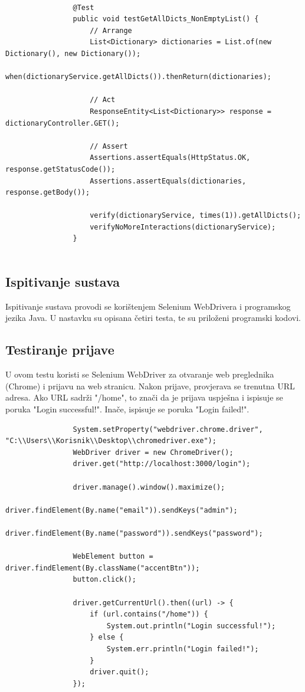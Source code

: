 			\begin{lstlisting}
				
				@Test
				public void testGetAllDicts_NonEmptyList() {
					// Arrange
					List<Dictionary> dictionaries = List.of(new Dictionary(), new Dictionary());
					when(dictionaryService.getAllDicts()).thenReturn(dictionaries);
					
					// Act
					ResponseEntity<List<Dictionary>> response = dictionaryController.GET();
					
					// Assert
					Assertions.assertEquals(HttpStatus.OK, response.getStatusCode());
					Assertions.assertEquals(dictionaries, response.getBody());
					
					verify(dictionaryService, times(1)).getAllDicts();
					verifyNoMoreInteractions(dictionaryService);
				}
				
			\end{lstlisting}
			
			\subsection{Ispitivanje sustava}
			
			Ispitivanje sustava provodi se korištenjem Selenium WebDrivera i programskog jezika Java. U nastavku su opisana četiri testa, te su priloženi programski kodovi.
			
			\subsection{Testiranje prijave}

			U ovom testu koristi se Selenium WebDriver za otvaranje web preglednika (Chrome) i prijavu na web stranicu. Nakon prijave, provjerava se trenutna URL adresa. Ako URL sadrži "/home", to znači da je prijava uspješna i ispisuje se poruka "Login successful!". Inače, ispisuje se poruka "Login failed!".

			\begin{lstlisting}
				System.setProperty("webdriver.chrome.driver", "C:\\Users\\Korisnik\\Desktop\\chromedriver.exe");
				WebDriver driver = new ChromeDriver();
				driver.get("http://localhost:3000/login");
		
				driver.manage().window().maximize();
				driver.findElement(By.name("email")).sendKeys("admin");
				driver.findElement(By.name("password")).sendKeys("password");
		
				WebElement button = driver.findElement(By.className("accentBtn"));
				button.click();
		
				driver.getCurrentUrl().then((url) -> {
					if (url.contains("/home")) {
						System.out.println("Login successful!");
					} else {
						System.err.println("Login failed!");
					}
					driver.quit();        
				});	

			\end{lstlisting}
			
